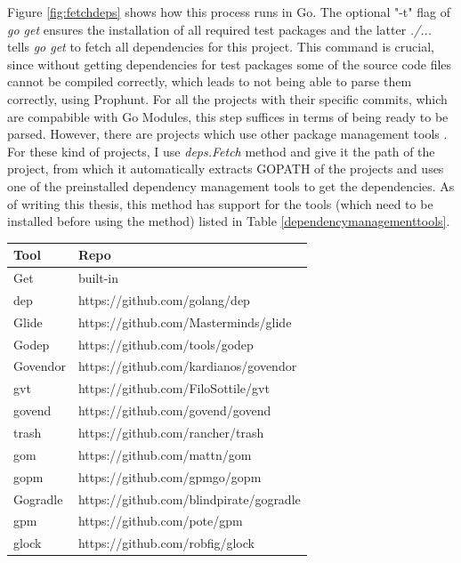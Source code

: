 \documentclass{seal_thesis}
\begin{document}
\noindent Figure \ref{fig:fetchdeps} shows how this process runs in Go. The optional "-t" flag of \textit{go get} ensures the installation of all required test packages and the latter \textit{./...} tells \textit{go get} to fetch all dependencies for this project. This command is crucial, since without getting dependencies for test packages some of the source code files cannot be compiled correctly, which leads to not being able to parse them correctly, using Prophunt. For all the projects with their specific commits, which are compabible with Go Modules, this step suffices in terms of being ready to be parsed. However, there are projects which use other package management tools \cite{packagemanagement}. For these kind of projects, I use \textit{deps.Fetch} method and give it the path of the project, from which it automatically extracts GOPATH of the projects and uses one of the preinstalled dependency management tools to get the dependencies. As of writing this thesis, this method has support for the tools (which need to be installed before using the method) listed in Table \ref{dependencymanagementtools}.

\begin{table}[H]
\caption{List of dependency management tools supported in GoABS}
\label{dependencymanagementtools}
\begin{longtable}[c]{@{}ll@{}}
	\toprule
	Tool & Repo \\* \midrule
	\endfirsthead
	\endhead
	\bottomrule
	\endfoot
	\endlastfoot
	Get & built-in \\
	dep & https://github.com/golang/dep \\
	Glide & https://github.com/Masterminds/glide \\
	Godep & https://github.com/tools/godep \\
	Govendor & https://github.com/kardianos/govendor \\
	gvt & https://github.com/FiloSottile/gvt \\
	govend & https://github.com/govend/govend \\
	trash & https://github.com/rancher/trash \\
	gom & https://github.com/mattn/gom \\
	gopm & https://github.com/gpmgo/gopm \\
	Gogradle & https://github.com/blindpirate/gogradle \\
	gpm & https://github.com/pote/gpm \\
	glock & https://github.com/robfig/glock \\* \bottomrule
\end{longtable}
\end{table}
\end{document}
